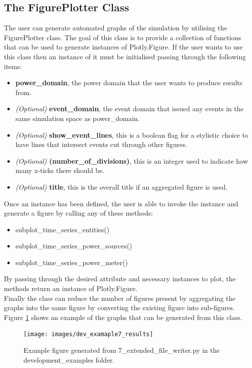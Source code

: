 \documentclass{l4proj}
\begin{document}
\subsection{The FigurePlotter Class}\label{subsec:imp:figureplotter}
The user can generate automated graphs of the simulation by utilising the FigurePlotter class.
The goal of this class is to provide a collection of functions that can be used to generate instances of Plotly.Figure.
If the user wants to use this class then an instance of it must be initialised passing through the following items:
\begin{itemize}
    \item \textbf{power\_domain}, the power domain that the user wants to produce results from.
    \item \textit{(Optional)} \textbf{event\_domain}, the event domain that issued any events in the same simulation space as power\_domain.
    \item \textit{(Optional)} \textbf{show\_event\_lines}, this is a boolean flag for a stylistic choice to have lines that intersect events cut through other figures.
    \item \textit{(Optional)} \textbf{(number\_of\_divisions)}, this is an integer used to indicate how many x-ticks there should be.
    \item \textit{(Optional)} \textbf{title}, this is the overall title if an aggregated figure is used.
\end{itemize}
Once an instance has been defined, the user is able to invoke the instance and generate a figure by calling any of these methods:
\begin{itemize}
    \item subplot\_time\_series\_entities()
    \item subplot\_time\_series\_power\_sources()
    \item subplot\_time\_series\_power\_meter()
\end{itemize}
By passing through the desired attribute and necessary instances to plot, the methods return an instance of Plotly.Figure.\\
Finally the class can reduce the number of figures present by aggregating the graphs into the same figure by converting the existing figure into sub-figures.
Figure \ref{fig:dev-example7-results} shows an example of the graphs that can be generated from this class.
\begin{figure}[h]
    \centering
    \texttt{[image: images/dev\_examaple7\_results]}
    ~
    \caption{Example figure generated from 7\_extended\_file\_writer.py in the development\_examples folder.}
    \label{fig:dev-example7-results}
\end{figure}
\end{document}
